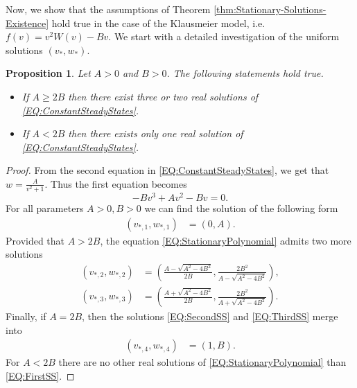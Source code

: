 \documentclass[preprint,12pt]{elsarticle}
\theoremstyle{plain}
\newtheorem{prp}{Proposition}[section]
\theoremstyle{definition}
\theoremstyle{remark}
\begin{document}
Now, we show that the assumptions of Theorem \ref{thm:Stationary-Solutions-Existence} hold true in the case of the Klausmeier model, i.e.\ $f(v) = v^2W(v) - Bv$. We start with a detailed investigation of the uniform solutions $(v_*, w_*)$.

\begin{prp}
    \label{prp:ExistenceOfConstantSSKineticSystem}
    Let $A > 0$ and $B > 0$. The following statements hold true.
    \begin{itemize}
        \item If $A \geq 2B$ then there exist three or two real solutions of \eqref{EQ:ConstantSteadyStates}.
        \item If $A < 2B$ then there exists only one real solution of \eqref{EQ:ConstantSteadyStates}.
    \end{itemize}
\end{prp}

\begin{proof}
    From the second equation in \eqref{EQ:ConstantSteadyStates}, we get that $w = \frac{A}{v^2 + 1}$. Thus the first equation becomes
    \begin{equation}
        \label{EQ:StationaryPolynomial}
        -B v^3 + A v^2 - B v = 0.
    \end{equation}
    For all parameters $A > 0, B > 0$ we can find the solution of the following form
    \begin{align}
        \label{EQ:FirstSS}
        \left(v_{*,1}, w_{*,1}\right) &= \left(0, A\right).
    \end{align}
    Provided that $A > 2B$, the equation \eqref{EQ:StationaryPolynomial} admits two more solutions
    \begin{align}
        \left(v_{*,2}, w_{*,2}\right) &= \left(\frac{A - \sqrt{A^2 - 4B^2}}{2B}, \frac{2 B^2}{A - \sqrt{A^2 - 4B^2}}\right), \label{EQ:SecondSS}\\
        \left(v_{*,3}, w_{*,3}\right) &= \left(\frac{A + \sqrt{A^2 - 4B^2}}{2B}, \frac{2 B^2}{A + \sqrt{A^2 - 4B^2}}\right). \label{EQ:ThirdSS}
    \end{align}
    Finally, if $A = 2B$, then the solutions \eqref{EQ:SecondSS} and \eqref{EQ:ThirdSS} merge into 
    \begin{align}
        \label{EQ:FourthSS}
        \left( v_{*,4}, w_{*,4} \right) &= \left(1, B\right).
    \end{align}
    For $A < 2B$ there are no other real solutions of \eqref{EQ:StationaryPolynomial} than \eqref{EQ:FirstSS}.
\end{proof}
\end{document}
